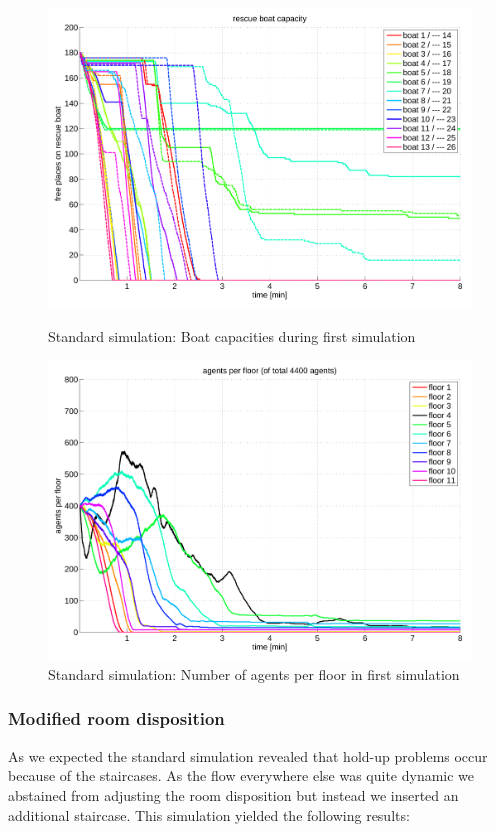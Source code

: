 \documentclass[11pt]{article}
\begin{document}
\begin{figure}[htbp]
\centering
{\begin{minipage}[t]{7.4cm}
\includegraphics[width=\textwidth]{pics/standard_cap1.pdf}
\caption{Standard simulation: Boat capacities during first simulation}
\end{minipage}}
{\begin{minipage}[t]{7.4cm}
\includegraphics[width=\textwidth]{pics/standard_agents1.pdf}
\caption{Standard simulation: Number of agents per floor in first simulation}
\end{minipage}}
\end{figure}

\subsubsection{Modified room disposition}
As we expected the standard simulation revealed that hold-up problems occur because of the staircases. As the flow everywhere else was quite dynamic we abstained from adjusting the room disposition but instead we inserted an additional staircase. This simulation yielded the following results:
\end{document}
